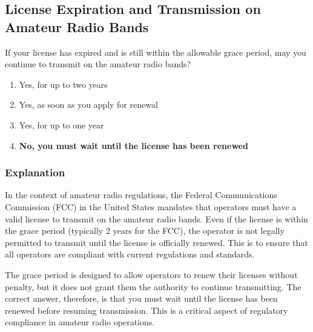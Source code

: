 \subsection{License Expiration and Transmission on Amateur Radio Bands}\label{T1C11}

\begin{tcolorbox}[colback=gray!10!white,colframe=black!75!black,title=T1C11]
If your license has expired and is still within the allowable grace period, may you continue to transmit on the amateur radio bands?
\begin{enumerate}[label=\Alph*)]
    \item Yes, for up to two years
    \item Yes, as soon as you apply for renewal
    \item Yes, for up to one year
    \item \textbf{No, you must wait until the license has been renewed}
\end{enumerate}
\end{tcolorbox}

\subsubsection{Explanation}
In the context of amateur radio regulations, the Federal Communications Commission (FCC) in the United States mandates that operators must have a valid license to transmit on the amateur radio bands. Even if the license is within the grace period (typically 2 years for the FCC), the operator is not legally permitted to transmit until the license is officially renewed. This is to ensure that all operators are compliant with current regulations and standards.

The grace period is designed to allow operators to renew their licenses without penalty, but it does not grant them the authority to continue transmitting. The correct answer, therefore, is that you must wait until the license has been renewed before resuming transmission. This is a critical aspect of regulatory compliance in amateur radio operations.

